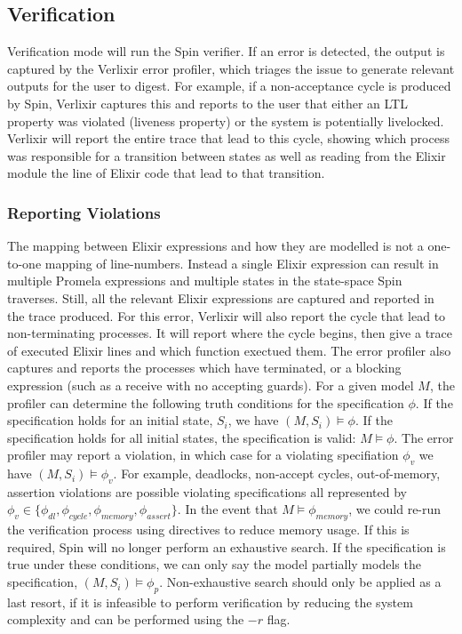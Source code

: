\subsection{Verification}
Verification mode will run the Spin verifier. If an error is detected, the output is captured by the Verlixir error profiler, which triages the issue to generate relevant outputs for the user to digest. For example, if a non-acceptance cycle is produced by Spin, Verlixir captures this and reports to the user that either an LTL property was violated (liveness property) or the system is potentially livelocked. Verlixir will report the entire trace that lead to this cycle, showing which process was responsible for a transition between states as well as reading from the Elixir module the line of Elixir code that lead to that transition. 
\par
\subsubsection{Reporting Violations}
The mapping between Elixir expressions and how they are modelled is not a one-to-one mapping of line-numbers. Instead a single Elixir expression can result in multiple Promela expressions and multiple states in the state-space Spin traverses. Still, all the relevant Elixir expressions are captured and reported in the trace produced. For this error, Verlixir will also report the cycle that lead to non-terminating processes. It will report where the cycle begins, then give a trace of executed Elixir lines and which function exectued them. The error profiler also captures and reports the processes which have terminated, or a blocking expression (such as a receive with no accepting guards). For a given model $M$, the profiler can determine the following truth conditions for the specification $\phi$. If the specification holds for an initial state, $S_i$, we have $(M, S_i) \models \phi$. If the specification holds for all initial states, the specification is valid: $M \models \phi$. The error profiler may report a violation, in which case for a violating specifiation $\phi _v$ we have $(M, S_i) \models \phi _v$. For example, deadlocks, non-accept cycles, out-of-memory, assertion violations are possible violating specifications all represented by $\phi _v \in \{\phi _{dl}, \phi _{cycle}, \phi _{memory}, \phi _{assert}\}$. In the event that $M \models \phi _{memory}$, we could re-run the verification process using directives to reduce memory usage. If this is required, Spin will no longer perform an exhaustive search. If the specification is true under these conditions, we can only say the model partially models the specification, $(M, S_i) \models \phi _p$. Non-exhaustive search should only be applied as a last resort, if it is infeasible to perform verification by reducing the system complexity and can be performed using the $-r$ flag. 
\par
